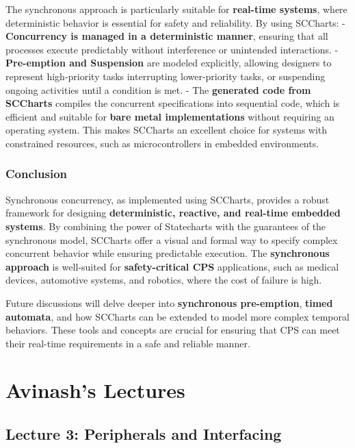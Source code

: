 \documentclass[
  14pt,
  a4paper,
  DIV=11,
  numbers=noendperiod,
  headinclude=true,
  footinclude=true]{scrreprt}
\begin{document}
The synchronous approach is particularly suitable for \textbf{real-time
systems}, where deterministic behavior is essential for safety and
reliability. By using SCCharts: - \textbf{Concurrency is managed in a
deterministic manner}, ensuring that all processes execute predictably
without interference or unintended interactions. - \textbf{Pre-emption
and Suspension} are modeled explicitly, allowing designers to represent
high-priority tasks interrupting lower-priority tasks, or suspending
ongoing activities until a condition is met. - The \textbf{generated
code from SCCharts} compiles the concurrent specifications into
sequential code, which is efficient and suitable for \textbf{bare metal
implementations} without requiring an operating system. This makes
SCCharts an excellent choice for systems with constrained resources,
such as microcontrollers in embedded environments.

\section{Conclusion}\label{conclusion-1}

Synchronous concurrency, as implemented using SCCharts, provides a
robust framework for designing \textbf{deterministic, reactive, and
real-time embedded systems}. By combining the power of Statecharts with
the guarantees of the synchronous model, SCCharts offer a visual and
formal way to specify complex concurrent behavior while ensuring
predictable execution. The \textbf{synchronous approach} is well-suited
for \textbf{safety-critical CPS} applications, such as medical devices,
automotive systems, and robotics, where the cost of failure is high.

Future discussions will delve deeper into \textbf{synchronous
pre-emption}, \textbf{timed automata}, and how SCCharts can be extended
to model more complex temporal behaviors. These tools and concepts are
crucial for ensuring that CPS can meet their real-time requirements in a
safe and reliable manner.

\part{Avinash's Lectures}

\chapter{Lecture 3: Peripherals and
Interfacing}\label{lecture-3-peripherals-and-interfacing}
\end{document}
